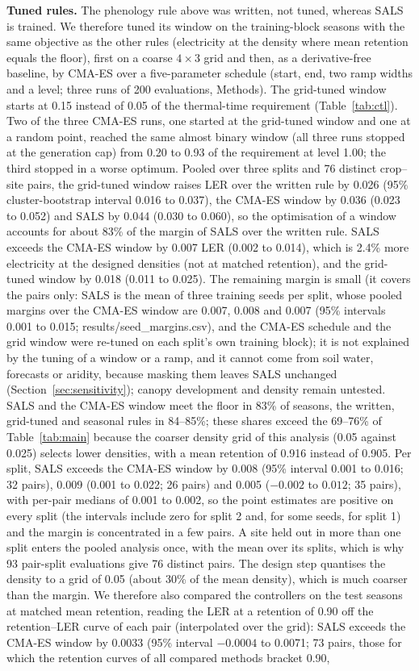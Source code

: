 \textbf{Tuned rules.} The phenology rule above was written, not tuned, whereas SALS is trained. We therefore tuned its window on the training-block seasons with the same objective as the other rules (electricity at the density where mean retention equals the floor), first on a coarse $4\times3$ grid and then, as a derivative-free baseline, by CMA-ES over a five-parameter schedule (start, end, two ramp widths and a level; three runs of 200 evaluations, Methods). The grid-tuned window starts at 0.15 instead of 0.05 of the thermal-time requirement (Table~\ref{tab:ctl}). Two of the three CMA-ES runs, one started at the grid-tuned window and one at a random point, reached the same almost binary window (all three runs stopped at the generation cap) from 0.20 to 0.93 of the requirement at level 1.00; the third stopped in a worse optimum. Pooled over three splits and 76 distinct crop--site pairs, the grid-tuned window raises LER over the written rule by 0.026 (95\% cluster-bootstrap interval 0.016 to 0.037), the CMA-ES window by 0.036 (0.023 to 0.052) and SALS by 0.044 (0.030 to 0.060), so the optimisation of a window accounts for about 83\% of the margin of SALS over the written rule. SALS exceeds the CMA-ES window by 0.007 LER (0.002 to 0.014), which is 2.4\% more electricity at the designed densities (not at matched retention), and the grid-tuned window by 0.018 (0.011 to 0.025). The remaining margin is small (it covers the pairs only: SALS is the mean of three training seeds per split, whose pooled margins over the CMA-ES window are 0.007, 0.008 and 0.007 (95\% intervals 0.001 to 0.015; results/seed\_margins.csv), and the CMA-ES schedule and the grid window were re-tuned on each split's own training block); it is not explained by the tuning of a window or a ramp, and it cannot come from soil water, forecasts or aridity, because masking them leaves SALS unchanged (Section~\ref{sec:sensitivity}); canopy development and density remain untested. SALS and the CMA-ES window meet the floor in 83\% of seasons, the written, grid-tuned and seasonal rules in 84--85\%; these shares exceed the 69--76\% of Table~\ref{tab:main} because the coarser density grid of this analysis (0.05 against 0.025) selects lower densities, with a mean retention of 0.916 instead of 0.905. Per split, SALS exceeds the CMA-ES window by 0.008 (95\% interval 0.001 to 0.016; 32 pairs), 0.009 (0.001 to 0.022; 26 pairs) and 0.005 ($-0.002$ to $0.012$; 35 pairs), with per-pair medians of 0.001 to 0.002, so the point estimates are positive on every split (the intervals include zero for split 2 and, for some seeds, for split 1) and the margin is concentrated in a few pairs. A site held out in more than one split enters the pooled analysis once, with the mean over its splits, which is why 93 pair-split evaluations give 76 distinct pairs. The design step quantises the density to a grid of 0.05 (about 30\% of the mean density), which is much coarser than the margin. We therefore also compared the controllers on the test seasons at matched mean retention, reading the LER at a retention of 0.90 off the retention--LER curve of each pair (interpolated over the grid): SALS exceeds the CMA-ES window by 0.0033 (95\% interval $-0.0004$ to 0.0071; 73 pairs, those for which the retention curves of all compared methods bracket 0.90, 
